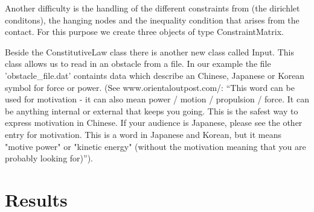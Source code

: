 \documentclass{article}
\begin{document}
Another difficulty is the handling of the different constraints from
(the dirichlet conditons), the hanging nodes and the inequality condition that 
arises from the contact. For this purpose we create three objects of type 
ConstraintMatrix.

Beside the ConstitutiveLaw class there is another new class called Input. This
class allows us to read in an obstacle from a file. In our example the file
'obstacle\_file.dat' containts data which describe an Chinese, Japanese or
Korean symbol for force or power. (See www.orientaloutpost.com/: ``This word can be used for motivation - it
can also mean power / motion / propulsion / force. It can be anything
internal or external that keeps you going. This is the safest way to express
motivation in Chinese. If your audience is Japanese, please see the other entry
for motivation. This is a word in Japanese and Korean, but it means "motive
power" or "kinetic energy" (without the motivation meaning that you are
probably looking for)'').

\section{Results}
\end{document}
